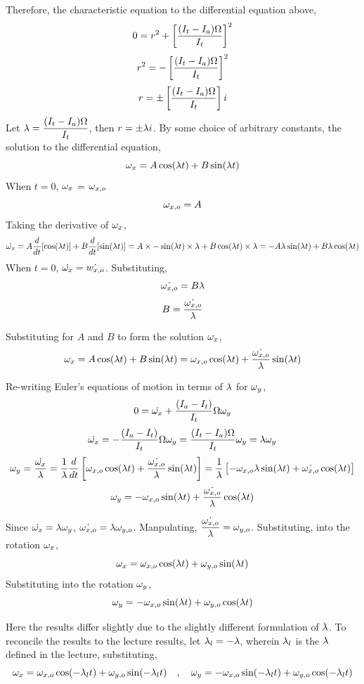 \documentclass[class=report, 12pt, crop=false]{standalone}
\begin{document}
\begin{center}
Therefore, the characteristic equation to the differential equation above,
$$0 = r^2 + \left[\frac{(I_{t}-I_{a})\Omega}{I_{t}}\right]^2$$
$$r^2 =  - \left[\frac{(I_{t}-I_{a})\Omega}{I_{t}}\right]^2$$
$$r =  \pm \left[\frac{(I_{t}-I_{a})\Omega}{I_{t}}\right]i$$
Let $\displaystyle{\lambda= \frac{(I_{t}-I_{a})\Omega}{I_{t}}}$, then $r = \pm\lambda i$. By some choice of arbitrary constants, the solution to the differential equation,
$$\omega_x = A\cos(\lambda t) + B\sin(\lambda t)$$
When $t=0$, $\omega_x$ = $\omega_{x,o}$
$$\omega_{x,o} = A$$
Taking the derivative of $\omega_x$,
$$\dot{\omega_x} = A\frac{d}{dt}[\cos(\lambda t)] + B\frac{d}{dt}[\sin(\lambda t)] = A\times-\sin(\lambda t)\times \lambda + B\cos(\lambda t)\times \lambda = -A\lambda\sin(\lambda t)  + B\lambda\cos(\lambda t)$$
When $t=0$, $\dot{\omega_x} = \dot{w_{x,o}}$. Substituting,
$$\dot{\omega_{x,o}} = B\lambda$$
$$B = \frac{\dot{\omega_{x,o}}}{\lambda}$$

Substituting for $A$ and $B$ to form the solution $\omega_x$,
$$\omega_x = A\cos(\lambda t) + B\sin(\lambda t) = \omega_{x,o}\cos(\lambda t) + \frac{\dot{\omega_{x,o}}}{\lambda}\sin(\lambda t)$$

Re-writing Euler's equations of motion in terms of $\lambda$ for $\omega_y$,
$$0 = \dot{\omega_x} + \frac{(I_{a} - I_{t})}{I_{t}}\Omega\omega_y$$
$$\dot{\omega_x} =  - \frac{(I_{a} - I_{t})}{I_{t}}\Omega\omega_y = \frac{(I_{t} - I_{a})\Omega}{I_{t}}\omega_y = \lambda\omega_y$$
$$\omega_y = \frac{\dot{\omega_x}}{\lambda} = \frac{1}{\lambda}\frac{d}{dt}\left[\omega_{x,o}\cos(\lambda t) + \frac{\dot{\omega_{x,o}}}{\lambda}\sin(\lambda t)\right] = \frac{1}{\lambda}\left[-\omega_{x,o}\lambda\sin(\lambda t) + \dot{\omega_{x,o}}\cos(\lambda t)\right]$$
$$\omega_y = -\omega_{x,o}\sin(\lambda t) + \frac{\dot{\omega_{x,o}}}{\lambda}\cos(\lambda t)$$

Since $\displaystyle{\dot{\omega_x} = \lambda\omega_y}$, $\displaystyle{\dot{\omega_{x,o}} = \lambda\omega_{y,o}}$. Manpulating, $\displaystyle{\frac{\dot{\omega_{x,o}}}{\lambda} = \omega_{y,o}}$. Substituting, into the rotation $\omega_x$,
$$\omega_x = \omega_{x,o}\cos(\lambda t) + \omega_{y,o}\sin(\lambda t)$$
Substituting into the rotation $\omega_y$,
$$\omega_y = -\omega_{x,o}\sin(\lambda t) + \omega_{y,o}\cos(\lambda t)$$

Here the results differ slightly due to the slightly different formulation of $\lambda$. To reconcile the results to the lecture results, let $\lambda_l = -\lambda$, wherein $\lambda_l$ is the $\lambda$ defined in the lecture, substituting,
$$\omega_x = \omega_{x,o}\cos(-\lambda_l t) + \omega_{y,o}\sin(-\lambda_l t) \quad,\quad \omega_y = -\omega_{x,o}\sin(-\lambda_l t) + \omega_{y,o}\cos(-\lambda_l t)$$
\\~\\



\end{center}
\end{document}
